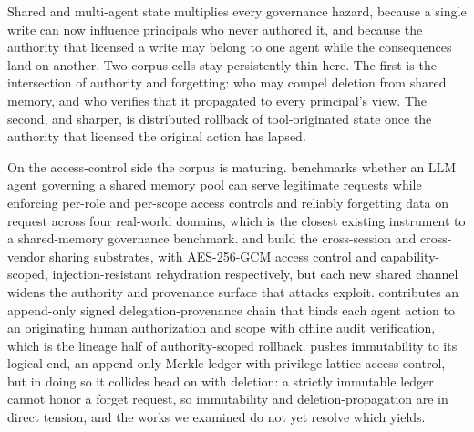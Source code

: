 Shared and multi-agent state multiplies every governance hazard, because a single
write can now influence principals who never authored it, and because the authority
that licensed a write may belong to one agent while the consequences land on another.
Two corpus cells stay persistently thin here. The first is the intersection of
authority and forgetting: who may compel deletion from shared memory, and who
verifies that it propagated to every principal's view. The second, and sharper, is
distributed rollback of tool-originated state once the authority that licensed the
original action has lapsed.

On the access-control side the corpus is maturing. \citet{ren2026gatemem}
benchmarks whether an LLM agent governing a shared memory pool can serve legitimate
requests while enforcing per-role and per-scope access controls and reliably
forgetting data on request across four real-world domains, which is the closest
existing instrument to a shared-memory governance benchmark. \citet{masoor2025samep}
and \citet{ravindran2026portablemem} build the cross-session and cross-vendor
sharing substrates, with AES-256-GCM access control and capability-scoped,
injection-resistant rehydration respectively, but each new shared channel widens
the authority and provenance surface that attacks exploit.
\citet{dalugoda2026hdp} contributes an append-only signed delegation-provenance chain
that binds each agent action to an originating human authorization and scope with
offline audit verification, which is the lineage half of authority-scoped rollback.
\citet{wright2025immutablemem} pushes immutability to its logical end, an append-only
Merkle ledger with privilege-lattice access control, but in doing so it collides head
on with deletion: a strictly immutable ledger cannot honor a forget request, so
immutability and deletion-propagation are in direct tension, and the works we
examined do not yet resolve which yields.

